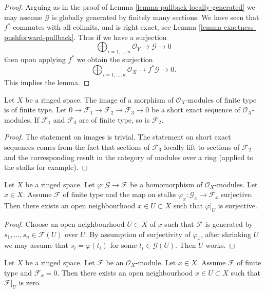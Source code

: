\begin{proof}
Arguing as in the proof of Lemma \ref{lemma-pullback-locally-generated}
we may assume $\mathcal{G}$ is globally generated by finitely
many sections.
We have seen that $f^*$ commutes with all colimits,
and is right exact, see Lemma \ref{lemma-exactness-pushforward-pullback}.
Thus if we have a surjection
$$
\bigoplus\nolimits_{i = 1, \ldots, n}
\mathcal{O}_Y
\to
\mathcal{G}
\to
0
$$
then upon applying $f^*$ we obtain the surjection
$$
\bigoplus\nolimits_{i = 1, \ldots, n}
\mathcal{O}_X
\to
f^*\mathcal{G}
\to
0.
$$
This implies the lemma.
\end{proof}

\begin{lemma}
\label{lemma-extension-finite-type}
Let $X$ be a ringed space.
The image of a morphism of $\mathcal{O}_X$-modules of finite
type is of finite type.
Let
$0 \to \mathcal{F}_1 \to \mathcal{F}_2 \to \mathcal{F}_3 \to 0$
be a short exact sequence of $\mathcal{O}_X$-modules.
If $\mathcal{F}_1$ and $\mathcal{F}_3$ are of finite type,
so is $\mathcal{F}_2$.
\end{lemma}

\begin{proof}
The statement on images is trivial.
The statement on short exact sequences comes from the
fact that sections of $\mathcal{F}_3$ locally lift to sections
of $\mathcal{F}_2$ and the corresponding result in
the category of modules over a ring (applied to the stalks
for example).
\end{proof}

\begin{lemma}
\label{lemma-finite-type-surjective-on-stalk}
Let $X$ be a ringed space.
Let $\varphi : \mathcal{G} \to \mathcal{F}$ be a homomorphism
of $\mathcal{O}_X$-modules.
Let $x \in X$. Assume $\mathcal{F}$ of finite type and
the map on stalks
$\varphi_x : \mathcal{G}_x \to \mathcal{F}_x$ surjective.
Then there exists an open neighbourhood
$x \in U \subset X$ such that $\varphi|_U$ is surjective.
\end{lemma}

\begin{proof}
Choose an open neighbourhood $U \subset X$ of $x$ such that $\mathcal{F}$ is
generated by $s_1, \ldots, s_n \in \mathcal{F}(U)$ over $U$.
By assumption of surjectivity of $\varphi_x$,
after shrinking $U$ we may assume that $s_i = \varphi(t_i)$
for some $t_i \in \mathcal{G}(U)$.
Then $U$ works.
\end{proof}

\begin{lemma}
\label{lemma-finite-type-stalk-zero}
Let $X$ be a ringed space.
Let $\mathcal{F}$ be an $\mathcal{O}_X$-module.
Let $x \in X$.
Assume $\mathcal{F}$ of finite type and $\mathcal{F}_x = 0$.
Then there exists an open neighbourhood
$x \in U \subset X$ such that $\mathcal{F}|_U$ is zero.
\end{lemma}

